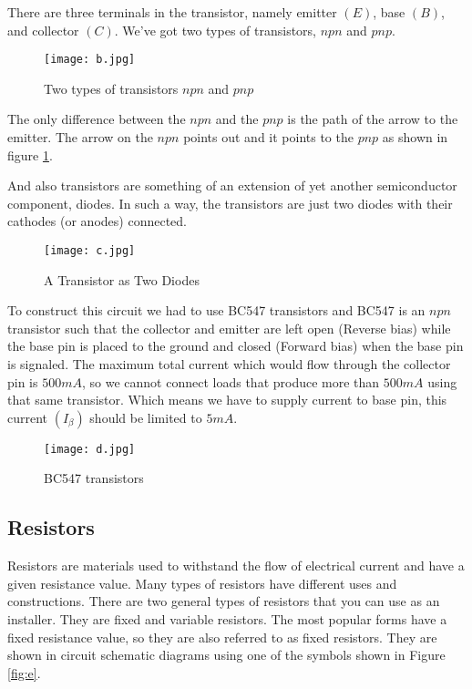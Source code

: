\documentclass[12pt,a4paper,oneside]{book}
\theoremstyle{plain}
\numberwithin{equation}{chapter} \DeclareMathOperator{\Var}{Var}
\begin{document}
    
There are three terminals in the transistor, namely emitter $(E)$, base $(B)$, and collector $(C)$. We've got two types of transistors, $npn$ and $pnp$.
\begin{figure}[hbt!]
    \centering
    \texttt{[image: b.jpg]}
    \caption{Two types of transistors $npn$ and $pnp$}
    \label{fig:b}
\end{figure}

\newpage
The only difference between the $npn$ and the $pnp$ is the path of the arrow to the emitter. The arrow on the $npn$ points out and it points to the $pnp$ as shown in figure \ref{fig:b}. 

And also transistors are something of an extension of yet another semiconductor component, diodes. In such a way, the transistors are just two diodes with their cathodes (or anodes) connected.

\begin{figure}[hbt!]
    \centering
    \texttt{[image: c.jpg]}
    \caption{A Transistor as Two Diodes}
    \label{fig:c}
\end{figure}

To construct this circuit we had to use BC547 transistors and BC547 is an $npn$ transistor such that the collector and emitter are left open (Reverse bias) while the base pin is placed to the ground and closed (Forward bias) when the base pin is signaled. The maximum total current which would flow through the collector pin is $500mA$, so we cannot connect loads that produce more than $500mA$ using that same transistor. Which means we have to supply current to base pin, this current $(I_{\beta})$ should be limited to $5mA$.

\begin{figure}[hbt!]
    \centering
    \texttt{[image: d.jpg]}
    \caption{BC547 transistors}
    \label{fig:d}
\end{figure}

\newpage

\subsection{Resistors}
Resistors are materials used to withstand the flow of electrical current and have a given resistance value. Many types of resistors have different uses and constructions. There are two general types of resistors that you can use as an installer. They are fixed and variable resistors. The most popular forms have a fixed resistance value, so they are also referred to as fixed resistors. They are shown in circuit schematic diagrams using one of the symbols shown in Figure \ref{fig:e}.
\end{document}
